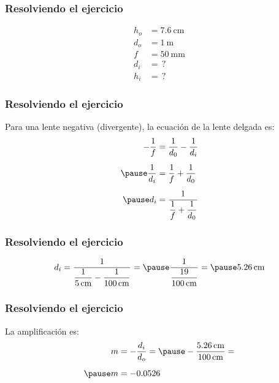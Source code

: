 \documentclass[14pt]{beamer}
\begin{document}
\begin{frame}
\frametitle{Resolviendo el ejercicio}
\vspace*{-1.5cm}
\pause
\begin{align*}
h_{o} &= \SI{7.6}{\centi\meter} \\
d_{o} &= \SI{1}{\meter} \\
f &= \SI{50}{\milli\meter} \\
d_{i} &= \, ? \\
h_{i} &= \, ?
\end{align*}
\end{frame}
\begin{frame}
\frametitle{Resolviendo el ejercicio}
\vspace*{-1.5cm}
Para una lente negativa (divergente), la ecuación de la lente delgada es:
\\
\pause
\begin{eqnarray*}
\begin{aligned}
- \dfrac{1}{f} &= \dfrac{1}{d_{0}} - \dfrac{1}{d_{i}} \\[0.5em] \pause
\dfrac{1}{d_{i}} &= \dfrac{1}{f} + \dfrac{1}{d_{0}} \\[0.5em] \pause
d_{i} &= \dfrac{1}{\dfrac{1}{f} + \dfrac{1}{d_{0}}}     
\end{aligned}
\end{eqnarray*}
\end{frame}
\begin{frame}
\frametitle{Resolviendo el ejercicio}
\pause
\begin{eqnarray*}
\begin{aligned}
d_{i} = \dfrac{1}{\dfrac{1}{\SI{5}{\centi\meter}} - \dfrac{1}{\SI{100}{\centi\meter}}} = \pause \dfrac{1}{\dfrac{19}{\SI{100}{\centi\meter}}} = \pause \SI{5.26}{\centi\meter}
\end{aligned}
\end{eqnarray*}
\end{frame}
\begin{frame}
\frametitle{Resolviendo el ejercicio}
La amplificación es:
\\
\pause
\begin{eqnarray*}
\begin{aligned}
m &= - \dfrac{d_{i}}{d_{o}} = \pause - \dfrac{\SI{5.26}{\centi\meter}}{\SI{100}{\centi\meter}} = \\[0.5em] \pause
m &= - \num{0.0526}
\end{aligned}
\end{eqnarray*}
\end{frame}
\end{document}
